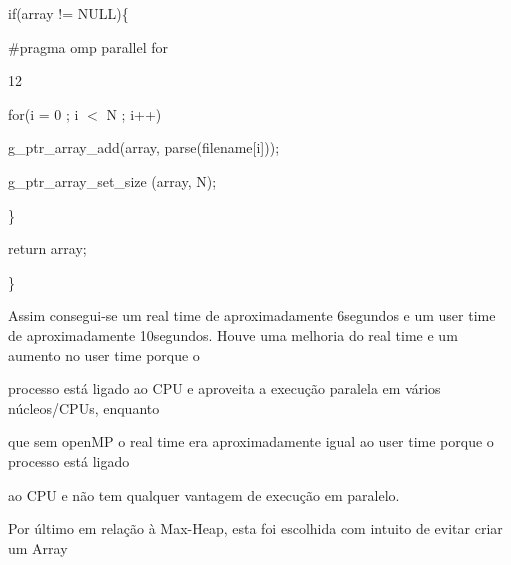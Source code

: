 \documentclass[a4paper,portrait,12pt]{article}
\begin{document}
\begin{flushleft}
if(array != NULL)\{
\end{flushleft}


\begin{flushleft}
\#pragma omp parallel for
\end{flushleft}


12





\begin{flushleft}
\newpage
for(i = 0 ; i $<$ N ; i++)
\end{flushleft}


\begin{flushleft}
g\_ptr\_array\_add(array, parse(filename[i]));
\end{flushleft}


\begin{flushleft}
g\_ptr\_array\_set\_size (array, N);
\end{flushleft}


\}


\begin{flushleft}
return array;
\end{flushleft}


\}





\begin{flushleft}
Assim consegui-se um real time de aproximadamente 6segundos e um user time de aproximadamente 10segundos. Houve uma melhoria do real time e um aumento no user time porque o
\end{flushleft}


\begin{flushleft}
processo está ligado ao CPU e aproveita a execução paralela em vários núcleos/CPUs, enquanto
\end{flushleft}


\begin{flushleft}
que sem openMP o real time era aproximadamente igual ao user time porque o processo está ligado
\end{flushleft}


\begin{flushleft}
ao CPU e não tem qualquer vantagem de execução em paralelo.
\end{flushleft}


\begin{flushleft}
Por último em relação à Max-Heap, esta foi escolhida com intuito de evitar criar um Array
\end{flushleft}
\end{document}
